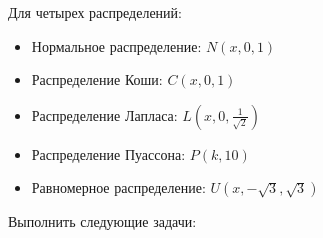 Для четырех распределений:
\begin{itemize}
	\item Нормальное распределение: $N(x, 0, 1)$
	\item Распределение Коши: $C(x, 0, 1)$
	\item Распределение Лапласа: $L(x, 0, \frac{1}{\sqrt{2}})$
	\item Распределение Пуассона: $P(k, 10)$
	\item Равномерное распределение: $U(x, -\sqrt{3}, \sqrt{3})$
\end{itemize}
Выполнить следующие задачи: